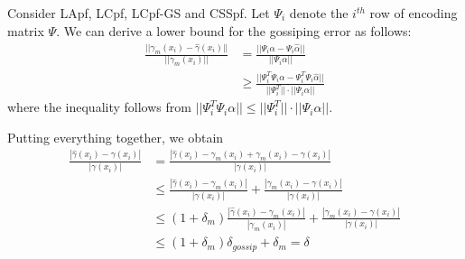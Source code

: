 \documentclass[10pt,letterpaper,final]{article}
\begin{document}
Consider LApf, LCpf, LCpf-GS and CSSpf. Let $\Psi_i$ denote the $i^{th}$ row of encoding matrix $\Psi$. We can derive a lower bound for the gossiping error as follows: 
\begin{align}
\frac{||\gamma_m(x_i)-\hat{\gamma}(x_i)||}{||\gamma_m(x_i)||}&=\frac{||\Psi_i\alpha-\Psi_i\hat{\alpha}||}{||\Psi_i\alpha||} \nonumber \\
&\geq \frac{||\Psi_i^T\Psi_i\alpha-\Psi_i^T\Psi_i\hat{\alpha}||}{||\Psi_i^T||\cdot ||\Psi_i\alpha||}
\end{align} 
where the inequality follows from $||\Psi_i^T\Psi_i \alpha|| \leq ||\Psi_i^T||\cdot ||\Psi_i\alpha||$.




Putting everything together, we obtain
\begin{align}
\frac{|\hat{\gamma}(x_i) - \gamma(x_i)|}{|\gamma(x_i)|}&=\frac{|\hat{\gamma}(x_i) -\gamma_m(x_i) + \gamma_m(x_i) - \gamma(x_i)|}{|\gamma(x_i)|} \\
&\leq \frac{|\hat{\gamma}(x_i) -\gamma_m(x_i)|}{|\gamma(x_i)|}+\frac{|\gamma_m(x_i) - \gamma(x_i)|}{|\gamma(x_i)|} \\
&\leq (1+\delta_m)\frac{|\hat{\gamma}(x_i) -\gamma_m(x_i)|}{|\gamma_m(x_i)|}+\frac{|\gamma_m(x_i) - \gamma(x_i)|}{|\gamma(x_i)|} \\
&\leq (1+\delta_m)\delta_{gossip} + \delta_m  = \delta
\label{eqn:error_bound}
\end{align}
\end{document}
